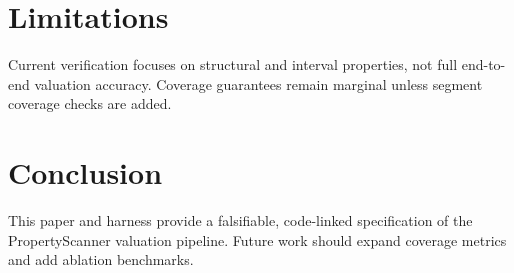\documentclass[11pt,a4paper]{article}
\begin{document}
\section{Limitations}
Current verification focuses on structural and interval properties, not full
end-to-end valuation accuracy. Coverage guarantees remain marginal unless
segment coverage checks are added.

\section{Conclusion}
This paper and harness provide a falsifiable, code-linked specification of the
PropertyScanner valuation pipeline. Future work should expand coverage metrics
and add ablation benchmarks.



\end{document}
